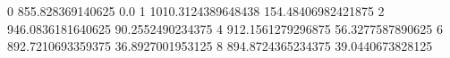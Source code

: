 0 855.828369140625 0.0
1 1010.3124389648438 154.48406982421875
2 946.0836181640625 90.2552490234375
4 912.1561279296875 56.3277587890625
6 892.7210693359375 36.8927001953125
8 894.8724365234375 39.0440673828125
